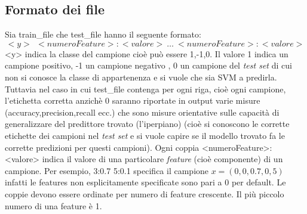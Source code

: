 \subsection{Formato dei file}
Sia train\_file che test\_file hanno il seguente formato:
\begin{equation*}
<y>\:\: <numeroFeature>:<valore> \:\dots\: <numeroFeature>:<valore>
\end{equation*}
<y> indica la classe del campione cioè può essere 1,-1,0. Il valore 1 indica un campione positivo, -1 un campione negativo , 0 un campione del \textit{test set} di cui non si conosce la classe di appartenenza e si vuole che sia \ac{SVM} a predirla. Tuttavia nel caso in cui test\_file contenga per ogni riga, cioè ogni campione, l'etichetta corretta anzichè 0  saranno riportate in output varie misure (accuracy,precision,recall ecc.) che sono misure orientative sulle capacità di generalizzare del predittore trovato (l'iperpiano) (cioè si conoscono le corrette etichette dei campioni nel \textit{test set} e si vuole capire se il modello trovato fa le corrette predizioni per questi campioni). Ogni coppia <numeroFeature>:<valore> indica il valore di una particolare \textit{feature} (cioè componente) di un campione. Per esempio, 3:0.7 5:0.1  specifica il campione $x=(0,0,0.7,0,5)$ infatti le features non esplicitamente specificate sono pari a 0 per default. Le coppie devono essere ordinate per numero di feature crescente. Il più piccolo numero di una feature è 1.

